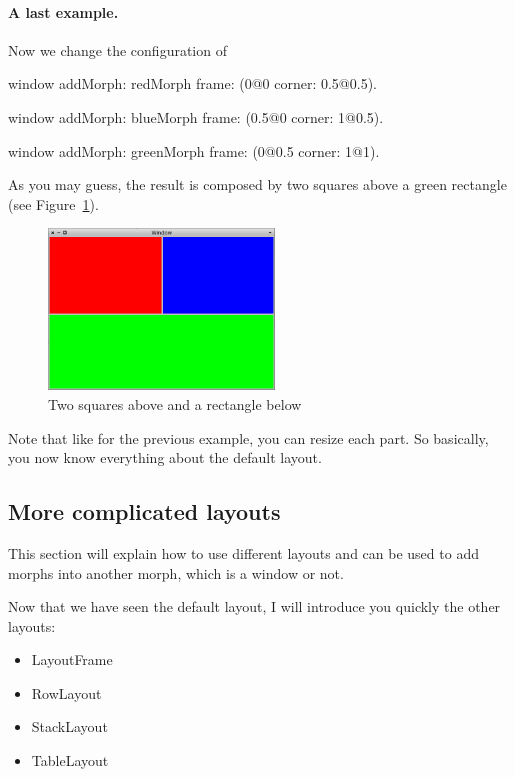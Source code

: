\documentclass[a4paper,10pt,twoside]{book}
\begin{document}
\paragraph{A last example.}
Now we change the configuration of 
\begin{code}{}
window
	addMorph: redMorph
	frame: (0@0 corner: 0.5@0.5).

window
	addMorph: blueMorph
	frame: (0.5@0 corner: 1@0.5).

window
	addMorph: greenMorph
	frame: (0@0.5 corner: 1@1).
\end{code}

As you may guess, the result is composed by two squares above a green rectangle (see Figure~\ref{fig:simpleLayoutExample3}).

\begin{figure}[ht]\centering
	\includegraphics[width=6cm]{SimpleLayoutExample3}
	\caption{Two squares above and a rectangle below}
	\label{fig:simpleLayoutExample3}
\end{figure}

Note that like for the previous example, you can resize each part. So basically, you now know everything about the default layout.


%
%


\subsection{More complicated layouts}

This section will explain how to use different layouts and can be used to add morphs into another morph, which is a window or not.

Now that we have seen the default layout, I will introduce you quickly the other layouts:
\begin{itemize}
	\item LayoutFrame
	\item RowLayout
	\item StackLayout
	\item TableLayout
\end{itemize}
\end{document}
